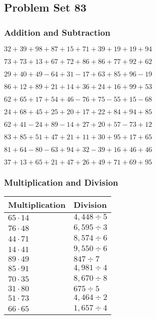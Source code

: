 \hypertarget{problem-set-83}{%
\subsection{Problem Set 83}\label{problem-set-83}}

\hypertarget{addition-and-subtraction}{%
\subsubsection{Addition and
Subtraction}\label{addition-and-subtraction}}

\(32+39+98+87+15+71+39+19+19+94\)

\(73+73+13+67+72+86+86+77+92+62\)

\(29+40+49-64+31-17+63+85+96-19\)

\(86+12+89+21+14+36+24+16+99+53\)

\(62+65+17+54+46-76+75-55+15-68\)

\(24+68+45+25+20+17+22+84+94+85\)

\(62+41-24+89-14+27+20+57-73+12\)

\(83+85+51+47+21+11+30+95+17+65\)

\(81+64-80-63+94+32-39+16+46+46\)

\(37+13+65+21+47+26+49+71+69+95\)

\hypertarget{multiplication-and-division}{%
\subsubsection{Multiplication and
Division}\label{multiplication-and-division}}

\begin{longtable}[]{@{}ll@{}}
\toprule
Multiplication & Division\tabularnewline
\midrule
\endhead
\(65\cdot14\) & \(4,448÷5\)\tabularnewline
\(76\cdot48\) & \(6,595÷3\)\tabularnewline
\(44\cdot71\) & \(8,574÷6\)\tabularnewline
\(14\cdot41\) & \(9,550÷6\)\tabularnewline
\(89\cdot49\) & \(847÷7\)\tabularnewline
\(85\cdot91\) & \(4,981÷4\)\tabularnewline
\(70\cdot35\) & \(8,670÷8\)\tabularnewline
\(31\cdot80\) & \(675÷5\)\tabularnewline
\(51\cdot73\) & \(4,464÷2\)\tabularnewline
\(66\cdot65\) & \(1,657÷4\)\tabularnewline
\bottomrule
\end{longtable}
